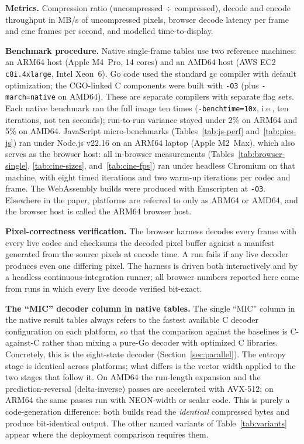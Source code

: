 \documentclass[journal]{IEEEtran}
\begin{document}
\textbf{Metrics.} Compression ratio (uncompressed $\div$ compressed), decode
and encode throughput in MB/s of uncompressed pixels, browser decode
latency per frame and cine frames per second, and modelled time-to-display.

\textbf{Benchmark procedure.}
\label{subsec:bench-procedure}
Native single-frame tables use two reference machines: an ARM64 host (Apple
M4~Pro, 14 cores) and an AMD64 host (AWS EC2 \texttt{c8i.4xlarge}, Intel
Xeon~6). Go code used the standard gc compiler with default optimization;
the CGO-linked C components were built with \texttt{-O3} (plus
\texttt{-march=native} on AMD64). These are separate compilers with separate
flag sets. Each native benchmark ran the full image ten times
(\texttt{-benchtime=10x}, i.e., ten iterations, not ten seconds);
run-to-run variance stayed under 2\% on ARM64 and 5\% on AMD64. JavaScript
micro-benchmarks (Tables~\ref{tab:js-perf} and~\ref{tab:pics-js}) ran under
Node.js v22.16 on an ARM64 laptop (Apple M2~Max), which also serves as the
browser host: all in-browser measurements (Tables~\ref{tab:browser-single},
\ref{tab:cine-sizes}, and~\ref{tab:cine-fps}) ran under headless Chromium on
that machine, with eight timed iterations and two warm-up iterations per
codec and frame. The WebAssembly builds were produced with Emscripten at
\texttt{-O3}. Elsewhere in the paper, platforms are referred to only as
ARM64 or AMD64, and the browser host is called the ARM64 browser host.

\textbf{Pixel-correctness verification.} The browser harness decodes every
frame with every live codec and checksums the decoded pixel buffer against a
manifest generated from the source pixels at encode time. A run fails if any
live decoder produces even one differing pixel. The harness is driven both
interactively and by a headless continuous-integration runner; all browser
numbers reported here come from runs in which every live decode verified
bit-exact.

\textbf{The ``MIC'' decoder column in native tables.} The single ``MIC''
column in the native result tables always refers to the fastest available C
decoder configuration on each platform, so that the comparison against the
baselines is C-against-C rather than mixing a pure-Go decoder with optimized
C libraries. Concretely, this is the eight-state decoder
(Section~\ref{sec:parallel}). The entropy stage is identical across
platforms; what differs is the vector width applied to the two stages that
follow it. On AMD64 the run-length expansion and the prediction-reversal
(delta-inverse) passes are accelerated with AVX-512; on ARM64 the same passes
run with NEON-width or scalar code. This is purely a code-generation
difference: both builds read the \emph{identical} compressed bytes and
produce bit-identical output. The other named variants of
Table~\ref{tab:variants} appear where the deployment comparison requires
them.
\end{document}
